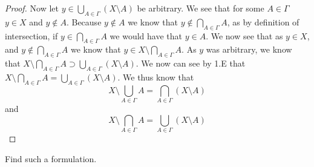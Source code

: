 \begin{proof}
Now let $y \in \bigcup_{A\in\Gamma} (X\setminus A)$ be arbitrary. We
see that for some $A \in\Gamma$ $y \in X$ and $y\notin A$. Because
$y\notin A$ we know that $y\notin \bigcap_{A\in\Gamma} A$, as by
definition of intersection, if  $y\in \bigcap_{A\in\Gamma} A$ we would
have that $y\in A$. We now see that as $y\in X$, and $y \notin
\bigcap_{A\in\Gamma} A$ we know that $y \in X \setminus \bigcap_{A \in
  \Gamma} A$. As $y$ was arbitrary, we know that  
$X \setminus \bigcap_{A \in \Gamma} A \supset \bigcup_{A\in\Gamma} 
(X\setminus A)$. We now can see by 1.E that  
$X \setminus \bigcap_{A \in \Gamma} A = \bigcup_{A\in\Gamma}
(X\setminus A)$.
We thus know that 
$$X \setminus \bigcup_{A \in \Gamma} A = \bigcap_{A\in\Gamma} (X \setminus A) $$
and
$$X \setminus \bigcap_{A \in \Gamma} A = \bigcup_{A\in\Gamma} (X \setminus A) $$
\end{proof}

\begin{minorEx}
    [Riddle]
    Find such a formulation.
\end{minorEx}
